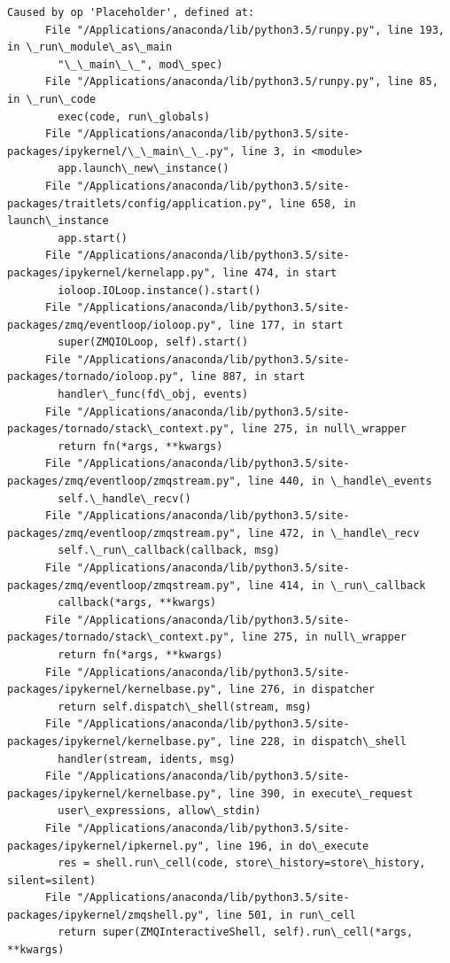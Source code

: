 \documentclass[11pt]{article}
\begin{document}
\begin{Verbatim}[commandchars=\\\{\}]
    Caused by op 'Placeholder', defined at:
      File "/Applications/anaconda/lib/python3.5/runpy.py", line 193, in \_run\_module\_as\_main
        "\_\_main\_\_", mod\_spec)
      File "/Applications/anaconda/lib/python3.5/runpy.py", line 85, in \_run\_code
        exec(code, run\_globals)
      File "/Applications/anaconda/lib/python3.5/site-packages/ipykernel/\_\_main\_\_.py", line 3, in <module>
        app.launch\_new\_instance()
      File "/Applications/anaconda/lib/python3.5/site-packages/traitlets/config/application.py", line 658, in launch\_instance
        app.start()
      File "/Applications/anaconda/lib/python3.5/site-packages/ipykernel/kernelapp.py", line 474, in start
        ioloop.IOLoop.instance().start()
      File "/Applications/anaconda/lib/python3.5/site-packages/zmq/eventloop/ioloop.py", line 177, in start
        super(ZMQIOLoop, self).start()
      File "/Applications/anaconda/lib/python3.5/site-packages/tornado/ioloop.py", line 887, in start
        handler\_func(fd\_obj, events)
      File "/Applications/anaconda/lib/python3.5/site-packages/tornado/stack\_context.py", line 275, in null\_wrapper
        return fn(*args, **kwargs)
      File "/Applications/anaconda/lib/python3.5/site-packages/zmq/eventloop/zmqstream.py", line 440, in \_handle\_events
        self.\_handle\_recv()
      File "/Applications/anaconda/lib/python3.5/site-packages/zmq/eventloop/zmqstream.py", line 472, in \_handle\_recv
        self.\_run\_callback(callback, msg)
      File "/Applications/anaconda/lib/python3.5/site-packages/zmq/eventloop/zmqstream.py", line 414, in \_run\_callback
        callback(*args, **kwargs)
      File "/Applications/anaconda/lib/python3.5/site-packages/tornado/stack\_context.py", line 275, in null\_wrapper
        return fn(*args, **kwargs)
      File "/Applications/anaconda/lib/python3.5/site-packages/ipykernel/kernelbase.py", line 276, in dispatcher
        return self.dispatch\_shell(stream, msg)
      File "/Applications/anaconda/lib/python3.5/site-packages/ipykernel/kernelbase.py", line 228, in dispatch\_shell
        handler(stream, idents, msg)
      File "/Applications/anaconda/lib/python3.5/site-packages/ipykernel/kernelbase.py", line 390, in execute\_request
        user\_expressions, allow\_stdin)
      File "/Applications/anaconda/lib/python3.5/site-packages/ipykernel/ipkernel.py", line 196, in do\_execute
        res = shell.run\_cell(code, store\_history=store\_history, silent=silent)
      File "/Applications/anaconda/lib/python3.5/site-packages/ipykernel/zmqshell.py", line 501, in run\_cell
        return super(ZMQInteractiveShell, self).run\_cell(*args, **kwargs)

\end{Verbatim}
\end{document}
